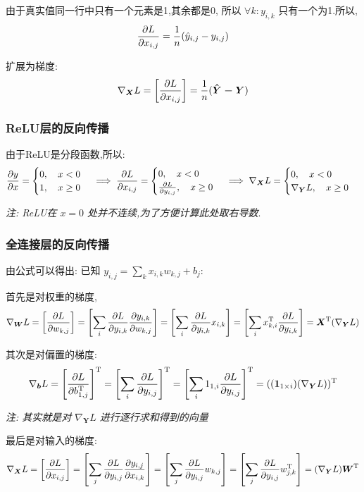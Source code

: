 由于真实值同一行中只有一个元素是1,其余都是0, 所以 $\forall k: y_{i,k}$ 只有一个为1.所以,
$$
\frac{\partial L}{\partial x_{i,j}} = \frac{1}{n}(\hat{y}_{i,j} - y_{i,j})
$$

扩展为梯度:
$$
\nabla_{\boldsymbol{X}} L = \left[\frac{\partial L}{\partial x_{i,j}}\right] = \frac{1}{n}(\boldsymbol{\hat{Y}-Y})
$$

\subsubsection{ReLU层的反向传播}

由于ReLU是分段函数,所以:
\begin{align*}
    \frac{\partial y}{\partial x} = \begin{cases}
    0 ,\quad x<0 \\
    1 ,\quad x \ge 0
    \end{cases} \implies
    \frac{\partial L}{\partial x_{i,j}} = \begin{cases}
    0 ,\quad x<0 \\
    \frac{\partial L}{\partial y_{i,j}} ,\quad x \ge 0
    \end{cases} \implies
    \nabla_{\boldsymbol{X}} L = \begin{cases}
    0 ,\quad x<0 \\
    \nabla_{\boldsymbol{Y}} L ,\quad x \ge 0
    \end{cases}
\end{align*}


\textit{注: ReLU在 $x=0$ 处并不连续,为了方便计算此处取右导数}.

\subsubsection{全连接层的反向传播}
由公式可以得出: 已知 $y_{i,j} = \sum_k x_{i,k}w_{k,j} + b_{j}$:

首先是对权重的梯度,
$$
\nabla_{\boldsymbol{W}} L = \left[\frac{\partial L}{\partial w_{k,j}}\right] = \left[\sum_i \frac{\partial L}{\partial y_{i,k}} \frac{\partial y_{i,k}}{\partial w_{k,j}}\right] = \left[\sum_i \frac{\partial L}{\partial y_{i,k}} x_{i,k}\right] = \left[\sum_i x^{\mathrm{T}}_{k,i}\frac{\partial L}{\partial y_{i,k}}\right] = \boldsymbol{X}^{\mathrm{T}} (\nabla_{\boldsymbol{Y}} L)
$$

其次是对偏置的梯度:
$$
\nabla_{\boldsymbol{b}} L = \left[\frac{\partial L}{\partial b^{\mathrm{T}}_{1,j}}\right]^{\mathrm{T}} = \left[\sum_i \frac{\partial L}{\partial y_{i,j}}\right]^{\mathrm{T}} = \left[\sum_i 1_{1,i} \frac{\partial L}{\partial y_{i,j}}\right]^{\mathrm{T}} = ((\boldsymbol{1}_{1 \times i}) (\nabla_{\boldsymbol{Y}} L))^{\mathrm{T}}
$$

\textit{注: 其实就是对 $\nabla_{\boldsymbol{Y}} L$ 进行逐行求和得到的向量}

最后是对输入的梯度:
$$
\nabla_{\boldsymbol{X}} L = \left[\frac{\partial L}{\partial x_{i,j}}\right] = \left[\sum_j \frac{\partial L}{\partial y_{i,j}} \frac{\partial y_{i,j}}{\partial x_{i,k}}\right] = \left[\sum_j \frac{\partial L}{\partial y_{i,j}} w_{k,j}\right] = \left[\sum_j  \frac{\partial L}{\partial y_{i,j}} w^{\mathrm{T}}_{j,k}\right] = (\nabla_{\boldsymbol{Y}} L) \boldsymbol{W}^{\mathrm{T}} 
$$

